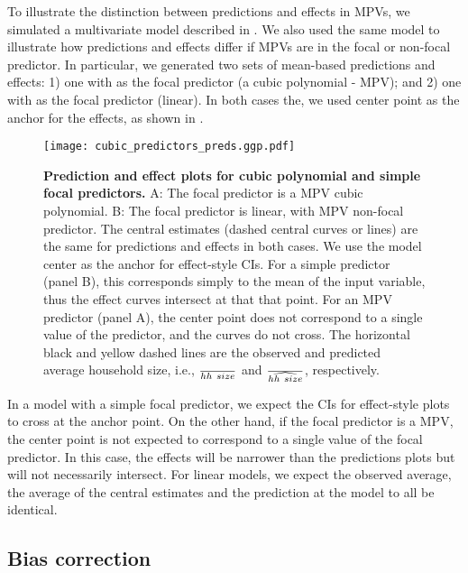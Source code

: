 To illustrate the distinction between predictions and effects in MPVs, we simulated a multivariate model described in . We also used the same model to illustrate how predictions and effects differ if MPVs are in the focal or non-focal predictor. In particular, we generated two sets of mean-based predictions and effects: 1) one with  as the focal predictor (a cubic polynomial - MPV); and 2) one with  as the focal predictor (linear). In both cases the, we used center point as the anchor for the effects, as shown in .
%
\begin{figure}
\begin{center}
\texttt{[image: cubic\_predictors\_preds.ggp.pdf]}
\end{center}
\caption{{\bf Prediction and effect plots for cubic polynomial and simple focal predictors.} A: The focal predictor is a MPV cubic polynomial. B: The focal predictor is linear, with MPV non-focal predictor. The central estimates (dashed central curves or lines) are the same for predictions and effects in both cases. We use the model center as the anchor for effect-style CIs. For a simple predictor (panel B), this corresponds simply to the mean of the input variable, thus the effect curves intersect at that that point. For an MPV predictor (panel A), the center point does not correspond to a single value of the predictor, and the curves do not cross. The horizontal black and yellow dashed lines are the observed and predicted average household size, i.e., $\over{hh~size}$ and $\over{\widehat{hh~size}}$, respectively.}
\label{fig:pred_cubic_plots}
\end{figure}
%
In a model with a simple focal predictor, we expect the CIs for effect-style plots to cross at the anchor point. On the other hand, if the focal predictor is a MPV, the center point is not expected to correspond to a single value of the focal predictor. In this case, the effects will be narrower than the predictions plots but will not necessarily intersect. 
For linear models, we expect the observed average, the average of the central estimates and the prediction at the model to all be identical. 

\subsection{Bias correction}

